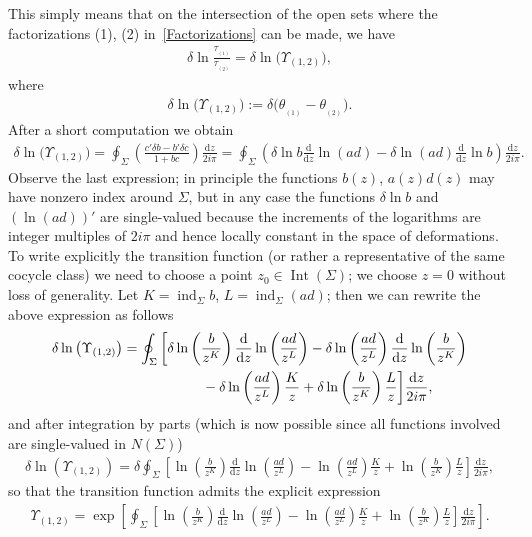 \documentclass[pdftex]{sigma}
\numberwithin{equation}{section}
\def \ddz{ \frac {\d z}{2i\pi}}
\def\d{\mathrm d}
\begin{document}
This simply means that on the intersection of the open sets where the factorizations {(1)}, {(2)} in~\eqref{Factorizations} can be made, we have
\begin{gather*}
\delta \ln \frac {\tau_{_{(1)}}}{\tau _{_{(2)}}}= \delta\ln \big( \Upsilon_{(1,2)}\big),
\end{gather*}
where
\begin{gather*}
\delta\ln \big( \Upsilon_{(1,2)}\big) :=\delta \big( \theta_{_{(1)}} - \theta_{_{(2)}} \big).
\end{gather*}
After a short computation we obtain
\begin{gather*}
\delta \ln \big( \Upsilon_{(1,2)}\big) = \oint_{\Sigma} \left(\frac { c' \delta b - b' \delta c}{1 + b c}\right) \ddz=
\oint_\Sigma\left( \delta \ln b \frac {\d}{\d z} \ln (ad) - \delta \ln (ad) \frac {\d}{\d z} \ln b \right)\ddz.
\end{gather*}
Observe the last expression; in principle the functions $b(z)$, $a(z)d(z)$ may have nonzero index around $\Sigma$, but in any case the functions $\delta \ln b$ and $(\ln (ad))'$ are single-valued because the increments of the logarithms are integer multiples of $2i\pi$ and hence locally constant in the space of deformations. To write explicitly the transition function (or rather a representative of the same cocycle class) we need to choose a point $z_0\in \operatorname{Int}(\Sigma)$; we choose $z=0$ without loss of generality. Let $K =\operatorname{ind}_\Sigma b$, $L = \operatorname{ind}_{\Sigma} (ad)$; then we can rewrite the above expression as follows
\begin{gather*}
\delta \ln \big( \Upsilon_{(1,2)}\big)=
\oint_\Sigma \bigg[ \delta \ln \left(\frac b {z^K} \right) \frac {\d}{\d z} \ln \left(\frac {ad} {z^L} \right)-
\delta \ln \left(\frac {ad} {z^L} \right) \frac {\d}{\d z} \ln \left(\frac {b} {z^K} \right)\\
\hphantom{\delta \ln \big( \Upsilon_{(1,2)}\big)=\oint_\Sigma \bigg[}{}
- \delta \ln \left(\frac {ad} {z^L} \right) \frac K z + \delta \ln \left(\frac {b} {z^K} \right) \frac L z\bigg] \ddz,
\end{gather*}
and after integration by parts (which is now possible since all functions involved are single-valued in $N(\Sigma)$)
\begin{gather*}
\delta \ln \left( \Upsilon_{(1,2)}\right) =\delta \oint_\Sigma
\left[ \ln \left(\frac b {z^K} \right) \frac {\d}{\d z} \ln \left(\frac {ad} {z^L} \right)
-\ln \left(\frac {ad} {z^L} \right) \frac K z + \ln \left(\frac {b} {z^K} \right) \frac L z\right] \ddz,
\end{gather*}
so that the transition function admits the explicit expression
\begin{gather*}
\Upsilon_{(1,2)} =\exp \left[\oint_\Sigma \left[ \ln \left(\frac b {z^K} \right) \frac {\d}{\d z} \ln \left(\frac {ad} {z^L} \right)
- \ln \left(\frac {ad} {z^L} \right) \frac K z + \ln \left(\frac {b} {z^K} \right) \frac L z \right] \ddz\right].
\end{gather*}
\end{document}
